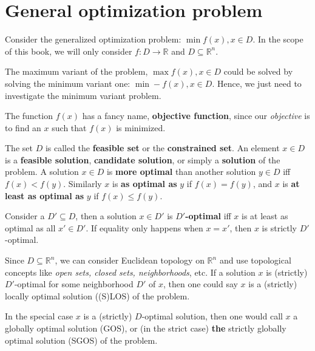 

\section{General optimization problem} %
\label{sec:General optimization problem}

Consider the generalized optimization problem: \( \min f(x), x \in D \). In the
scope of this book, we will only consider \( f: D \to \mathbb{R} \) and \( D
\subseteq \mathbb{R}^{n} \).

The maximum variant of the problem, \( \max f(x), x \in D \) could be solved by
solving the minimum variant one: \( \min -f(x), x \in D \). Hence, we just need
to investigate the minimum variant problem.

The function \( f(x) \) has a fancy name, \textbf{objective function}, since our
\textit{objective} is to find an \( x \) such that \( f(x) \) is minimized.

The set \( D \) is called the \textbf{feasible set} or the \textbf{constrained
set}. An element \( x \in D \) is a \textbf{feasible solution},
\textbf{candidate solution}, or simply a \textbf{solution} of the problem. A
solution \( x \in D \) is \textbf{more optimal} than another solution \( y \in D
\) iff \( f(x) < f(y) \). Similarly \( x \) is \textbf{as optimal as} \( y \) if \(
f(x) = f(y)\), and \( x \) is \textbf{at least as optimal as} \( y \) if \( f(x)
\le f(y)\).

Consider a \( D' \subseteq D \), then a solution \( x \in D' \) is \textbf{\( D'
\)-optimal} iff \( x \) is at least as optimal as all \( x' \in D' \). If
equality only happens when \( x = x' \), then \( x \) is strictly \( D'
\)-optimal.

Since \( D \subseteq  \mathbb{R}^{n} \), we can consider Euclidean topology on \(
\mathbb{R}^{n} \) and use topological concepts like \textit{open sets, closed
sets, neighborhoods}, etc. If a solution \( x \) is (strictly) \( D' \)-optimal
for some neighborhood \( D' \) of \( x \), then one could say \( x \) is a
(strictly) locally optimal solution ((S)LOS) of the problem.

In the special case \( x \) is a (strictly) \( D \)-optimal solution, then one
would call \( x \) a globally optimal solution (GOS), or (in the strict case)
\textbf{the} strictly globally optimal solution (SGOS) of the problem.

